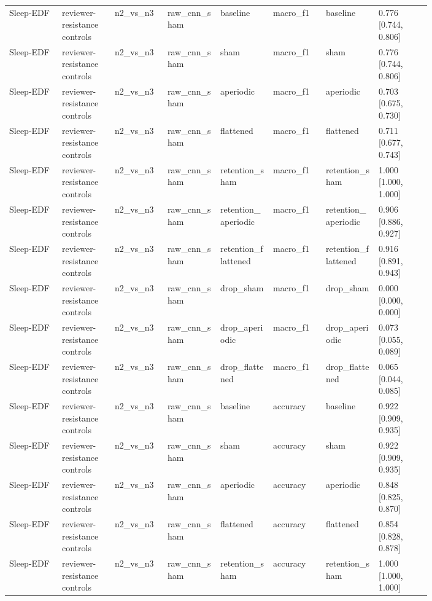 \begin{longtable}{p{0.10\linewidth}p{0.10\linewidth}p{0.10\linewidth}p{0.10\linewidth}p{0.10\linewidth}p{0.10\linewidth}p{0.10\linewidth}p{0.10\linewidth}}
Sleep-EDF & reviewer-resistance controls & n2\_vs\_n3 & raw\_cnn\_sham & baseline & macro\_f1 & baseline & 0.776 [0.744, 0.806]\\
Sleep-EDF & reviewer-resistance controls & n2\_vs\_n3 & raw\_cnn\_sham & sham & macro\_f1 & sham & 0.776 [0.744, 0.806]\\
Sleep-EDF & reviewer-resistance controls & n2\_vs\_n3 & raw\_cnn\_sham & aperiodic & macro\_f1 & aperiodic & 0.703 [0.675, 0.730]\\
Sleep-EDF & reviewer-resistance controls & n2\_vs\_n3 & raw\_cnn\_sham & flattened & macro\_f1 & flattened & 0.711 [0.677, 0.743]\\
Sleep-EDF & reviewer-resistance controls & n2\_vs\_n3 & raw\_cnn\_sham & retention\_sham & macro\_f1 & retention\_sham & 1.000 [1.000, 1.000]\\
Sleep-EDF & reviewer-resistance controls & n2\_vs\_n3 & raw\_cnn\_sham & retention\_aperiodic & macro\_f1 & retention\_aperiodic & 0.906 [0.886, 0.927]\\
Sleep-EDF & reviewer-resistance controls & n2\_vs\_n3 & raw\_cnn\_sham & retention\_flattened & macro\_f1 & retention\_flattened & 0.916 [0.891, 0.943]\\
Sleep-EDF & reviewer-resistance controls & n2\_vs\_n3 & raw\_cnn\_sham & drop\_sham & macro\_f1 & drop\_sham & 0.000 [0.000, 0.000]\\
Sleep-EDF & reviewer-resistance controls & n2\_vs\_n3 & raw\_cnn\_sham & drop\_aperiodic & macro\_f1 & drop\_aperiodic & 0.073 [0.055, 0.089]\\
Sleep-EDF & reviewer-resistance controls & n2\_vs\_n3 & raw\_cnn\_sham & drop\_flattened & macro\_f1 & drop\_flattened & 0.065 [0.044, 0.085]\\
Sleep-EDF & reviewer-resistance controls & n2\_vs\_n3 & raw\_cnn\_sham & baseline & accuracy & baseline & 0.922 [0.909, 0.935]\\
Sleep-EDF & reviewer-resistance controls & n2\_vs\_n3 & raw\_cnn\_sham & sham & accuracy & sham & 0.922 [0.909, 0.935]\\
Sleep-EDF & reviewer-resistance controls & n2\_vs\_n3 & raw\_cnn\_sham & aperiodic & accuracy & aperiodic & 0.848 [0.825, 0.870]\\
Sleep-EDF & reviewer-resistance controls & n2\_vs\_n3 & raw\_cnn\_sham & flattened & accuracy & flattened & 0.854 [0.828, 0.878]\\
Sleep-EDF & reviewer-resistance controls & n2\_vs\_n3 & raw\_cnn\_sham & retention\_sham & accuracy & retention\_sham & 1.000 [1.000, 1.000]\\

\end{longtable}
